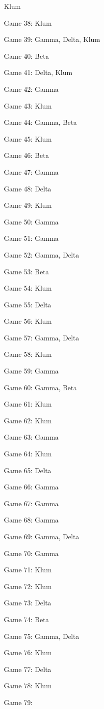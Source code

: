 \documentclass{article}
\begin{document}
\begin{multicols}{3}
\begin{compactitem}
Klum
\item Game 38:
Klum
\item Game 39:
Gamma, Delta, Klum
\item Game 40:
Beta
\item Game 41:
Delta, Klum
\item Game 42:
Gamma
\item Game 43:
Klum
\item Game 44:
Gamma, Beta
\item Game 45:
Klum
\item Game 46:
Beta
\item Game 47:
Gamma
\item Game 48:
Delta
\item Game 49:
Klum
\item Game 50:
Gamma
\item Game 51:
Gamma
\item Game 52:
Gamma, Delta
\item Game 53:
Beta
\item Game 54:
Klum
\item Game 55:
Delta
\item Game 56:
Klum
\item Game 57:
Gamma, Delta
\item Game 58:
Klum
\item Game 59:
Gamma
\item Game 60:
Gamma, Beta
\item Game 61:
Klum
\item Game 62:
Klum
\item Game 63:
Gamma
\item Game 64:
Klum
\item Game 65:
Delta
\item Game 66:
Gamma
\item Game 67:
Gamma
\item Game 68:
Gamma
\item Game 69:
Gamma, Delta
\item Game 70:
Gamma
\item Game 71:
Klum
\item Game 72:
Klum
\item Game 73:
Delta
\item Game 74:
Beta
\item Game 75:
Gamma, Delta
\item Game 76:
Klum
\item Game 77:
Delta
\item Game 78:
Klum
\item Game 79:

\end{compactitem}
\end{multicols}
\end{document}
